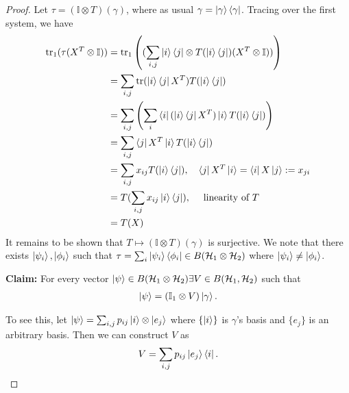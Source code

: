 \documentclass[10pt,oneside,longbibliography]{report}
\begin{document}
\begin{tcolorbox}[colframe=black,breakable, colback=black!5, arc=0pt, outer arc=0pt,boxrule=0.5pt]
\begin{proof}
Let $\tau = (\mathbb{I}\otimes T)(\gamma)$, where as usual $\gamma=\ket{\gamma}\bra{\gamma}$. Tracing over the first system, we have \begin{align}
    \text{tr}_1(\tau(X^{T}\otimes \mathbb{I})) &= \text{tr}_1\left((\sum_{i,j}\ket{i}\bra{j}\otimes T(\ket{i}\bra{j})(X^{T}\otimes \mathbb{I}))\right)\\
    &= \sum_{i,j} \text{tr}(\ket{i}\bra{j}X^T) T(\ket{i}\bra{j})\\
    &=\sum_{i,j} \left(\sum_{i}\bra{i}(\ket{i}\bra{j}X^T)\ket{i} T(\ket{i}\bra{j})\right)\\
    &=\sum_{i,j} \bra{j}X^T\ket{i} T(\ket{i}\bra{j})\\
    &=\sum_{i,j} x_{ij} T(\ket{i}\bra{j}), \quad\bra{j}X^T\ket{i}=\bra{i}X\ket{j}:=x_{ji}\\
    &= T(\sum_{i,j} x_{ij}\ket{i}\bra{j}), \quad \text{ linearity of } T\\
    &= T(X)
\end{align}
It remains to be shown that $T\mapsto (\mathbb{I} \otimes T)(\gamma)$ is surjective. We note that there exists $\ket{\psi_i},\ket{\phi_i}$ such that $\tau = \sum_i \ket{\psi_i}\bra{\phi_i} \in B(\mathcal{H}_1 \otimes \mathcal{H}_2)$ where $\ket{\psi_i} \neq \ket{\phi_i}$.

\vspace{1cm}
\noindent \textbf{Claim:} For every vector $\ket{\psi}\in B(\mathcal{H}_1 \otimes \mathcal{H}_2) \exists V\in B(\mathcal{H}_1,\mathcal{H}_2)$ such that 
\begin{align}
    \ket{\psi} =(\mathbb{I}_1 \otimes V)\ket{\gamma}.
\end{align}

To see this, let $\ket{\psi}=\sum_{i,j}p_{ij} \ket{i}\otimes \ket{e_j}$ where $\{\ket{i}\}$ is $\gamma$'s basis and $\{e_j\}$ is an arbitrary basis. Then we can construct $V$ as
\begin{align}
    V=\sum_{i,j} p_{ij} \ket{e_j}\bra{i}.
\end{align}


\end{proof}
\end{tcolorbox}
\end{document}
